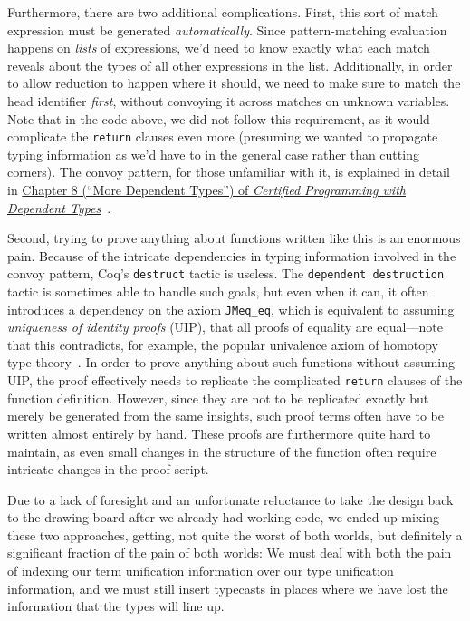 Furthermore, there are two additional complications.
First, this sort of match expression must be generated \emph{automatically}.
Since pattern-matching evaluation happens on \emph{lists} of expressions, we'd need to know exactly what each match reveals about the types of all other expressions in the list.
Additionally, in order to allow reduction to happen where it should, we need to make sure to match the head identifier \emph{first}, without convoying it across matches on unknown variables.
Note that in the code above, we did not follow this requirement, as it would complicate the \texttt{return} clauses even more (presuming we wanted to propagate typing information as we'd have to in the general case rather than cutting corners).
The convoy pattern, for those unfamiliar with it, is explained in detail in \href{http://adam.chlipala.net/cpdt/html/Cpdt.MoreDep.html#lab54}{Chapter 8 (``More Dependent Types'') of \emph{Certified Programming with Dependent Types}}~\cite{cpdt}.

Second, trying to prove anything about functions written like this is an enormous pain.
Because of the intricate dependencies in typing information involved in the convoy pattern, Coq's \texttt{destruct} tactic is useless.
The \texttt{dependent destruction} tactic is sometimes able to handle such goals, but even when it can, it often introduces a dependency on the axiom \texttt{JMeq_eq}, which is equivalent to assuming \emph{uniqueness of identity proofs} (UIP), that all proofs of equality are equal---note that this contradicts, for example, the popular univalence axiom of homotopy type theory~\cite{HoTTBook}.
In order to prove anything about such functions without assuming UIP, the proof effectively needs to replicate the complicated \texttt{return} clauses of the function definition.
However, since they are not to be replicated exactly but merely be generated from the same insights, such proof terms often have to be written almost entirely by hand.
These proofs are furthermore quite hard to maintain, as even small changes in the structure of the function often require intricate changes in the proof script.

Due to a lack of foresight and an unfortunate reluctance to take the design back to the drawing board after we already had working code, we ended up mixing these two approaches, getting, not quite the worst of both worlds, but definitely a significant fraction of the pain of both worlds:
We must deal with both the pain of indexing our term unification information over our type unification information, and we must still insert typecasts in places where we have lost the information that the types will line up.

